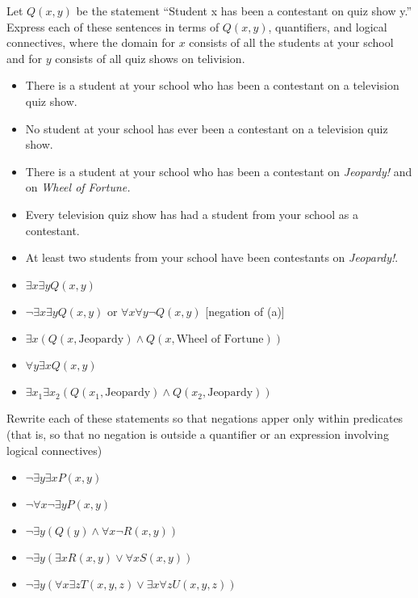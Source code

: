 \documentclass[addpoints]{exam}
\newenvironment{problem}[2][Problem]{\begin{trivlist}
    \item[\hskip \labelsep {\bfseries #1}\hskip \labelsep {\bfseries #2.}]}{\end{trivlist}}
\begin{document}
\begin{sloppypar}
\begin{problem}{16}
Let $Q(x,y)$ be the statement ``Student x has been a contestant on quiz show y.'' Express each of these sentences in terms of $Q(x,y)$, quantifiers, and logical connectives, where the domain for $x$ consists of all
the students at your school and for $y$ consists of all quiz shows on telivision.
\begin{itemize}
    \item[(a)] There is a student at your school who has been a contestant on a television quiz show.
    \item[(b)] No student at your school has ever been a contestant on a television quiz show.
    \item[(c)] There is a student at your school who has been a contestant on \textit{Jeopardy!} and on \textit{Wheel of Fortune.}
    \item[(d)] Every television quiz show has had a student from your school as a contestant.
    \item[(e)] At least two students from your school have been contestants on \textit{Jeopardy!}.
\end{itemize}
\end{problem}

\begin{questions}
    \question
    \begin{solution}
        \begin{itemize}
            \item[(a)] $ \exists x \exists y Q(x, y) $
            \item[(b)] $ \neg \exists x \exists y Q(x, y) $ or $ \forall x \forall y \neg Q(x, y) $ [negation of (a)]
            \item[(c)] $ \exists x (Q(x, \text{Jeopardy}) \land Q(x, \text{Wheel of Fortune})) $ 
            \item[(d)] $ \forall y \exists x Q(x, y) $
            \item[(e)] $ \exists x_1 \exists x_2 (Q(x_1, \text{Jeopardy}) \land Q(x_2, \text{Jeopardy})) $  
        \end{itemize}
    \end{solution}
\end{questions}
\pagebreak
\begin{problem}{17}
Rewrite each of these statements so that negations apper only within predicates (that is, so that no negation is outside a quantifier or an expression involving logical connectives)
\begin{itemize}
    \item[(a)] $\neg \exists y \exists x P(x,y)$
    \item[(b)] $\neg \forall x \neg \exists y P(x,y)$
    \item[(c)] $\neg \exists y(Q(y) \land \forall x \neg R(x, y))$
    \item[(d)] $\neg \exists y(\exists x R(x, y) \lor \forall x S(x, y))$
    \item[(e)] $\neg \exists y(\forall x \exists z T(x, y, z) \lor \exists x \forall z U(x, y, z))$
\end{itemize}
\end{problem}


\end{sloppypar}
\end{document}
